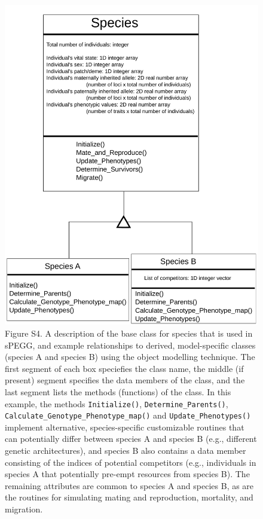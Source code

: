 \documentclass[11pt]{article}
\begin{document}
\begin{figure}[h!]
\begin{center}
   \includegraphics[width=0.9\linewidth] {SupplementaryFigures/FigS4.pdf}
\end{center}
\caption*{Figure S4.  A description of the base class for species that is used in sPEGG, and example relationships to derived, model-specific classes (species A and species B) using the object modelling technique. The first segment of each box speciefies the class name, the middle (if present) segment specifies the data members of the class, and the last segment lists the methods (functions) of the class. In this example, the methods \texttt{Initialize()}, \texttt{Determine\_Parents()}, \texttt{Calculate\_Genotype\_Phenotype\_map()} and \texttt{Update\_Phenotypes()} implement alternative, species-specific customizable routines that can potentially differ between species A and species B (e.g., different genetic architectures), and species B also contains a data member consisting of the indices of potential competitors (e.g., individuals in species A that potentially pre-empt resources from species B). The remaining attributes are common to species A and species B, as are the routines for simulating mating and reproduction, mortality, and migration.}
\end{figure}	
\end{document}
